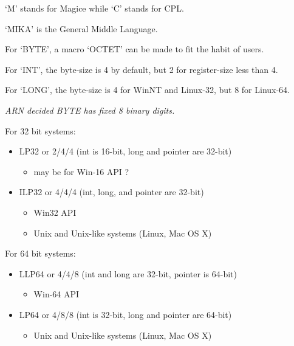 `M' stands for Magice while `C' stands for CPL.

`MIKA' is the General Middle Language.

For `BYTE', a macro `OCTET' can be made to fit the habit of users.

For `INT', the byte-size is 4 by default, but 2 for register-size less than 4.

For `LONG', the byte-size is 4 for WinNT and Linux-32, but 8 for Linux-64.

\textit{ARN decided BYTE has fixed 8 binary digits.}

For 32 bit systems:

\begin{itemize}

\item LP32 or 2/4/4 (int is 16-bit, long and pointer are 32-bit)

\begin{itemize}

\item may be for Win-16 API ?
\end{itemize}



\item ILP32 or 4/4/4 (int, long, and pointer are 32-bit)

\begin{itemize}

\item Win32 API
\item Unix and Unix-like systems (Linux, Mac OS X)
\end{itemize}



\end{itemize}

For 64 bit systems:

\begin{itemize}

\item LLP64 or 4/4/8 (int and long are 32-bit, pointer is 64-bit)

\begin{itemize}

\item Win-64 API
\end{itemize}



\item LP64 or 4/8/8 (int is 32-bit, long and pointer are 64-bit)

\begin{itemize}

\item Unix and Unix-like systems (Linux, Mac OS X)
\end{itemize}



\end{itemize}

